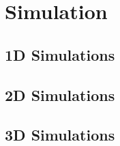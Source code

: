 \section{Simulation}
\subsection{1D Simulations}
\subsection{2D Simulations}
\subsection{3D Simulations}